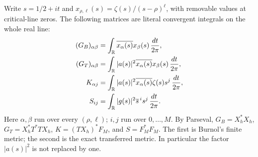 \documentclass[11pt]{article}
\begin{document}
Write $s=1/2+it$ and
$x_{\rho,\ell}(s)=\zeta(s)/(s-\rho)^\ell$, with removable
values at critical-line zeros. The following matrices are literal
convergent integrals on the whole real line:
\begin{equation}\label{eq:grams}
 \begin{aligned}
 (G_B)_{\alpha\beta}
   &=\int_\mathbb R\overline{x_\alpha(s)}x_\beta(s)\,\frac{dt}{2\pi},\\
 (G_T)_{\alpha\beta}
   &=\int_\mathbb R|a(s)|^2\overline{x_\alpha(s)}x_\beta(s)\,\frac{dt}{2\pi},\\
 K_{\alpha j}
   &=\int_\mathbb R|a(s)|^2\overline{x_\alpha(s)}\zeta(s)s^j\,\frac{dt}{2\pi},\\
 S_{ij}
   &=\int_\mathbb R|g(s)|^2\overline{s}^{\,i}s^j\,\frac{dt}{2\pi}.
 \end{aligned}
\end{equation}
Here $\alpha,\beta$ run over every $(\rho,\ell)$; $i,j$ run
over $0,\ldots,M$. By Parseval, $G_B=X_h^*X_h$,
$G_T=X_h^*T^*TX_h$, $K=(TX_h)^*F_M$, and $S=F_M^*F_M$.
The first is Burnol's finite metric; the second is the exact
transferred metric. In particular the factor $|a(s)|^2$ is not
replaced by one.
\end{document}
